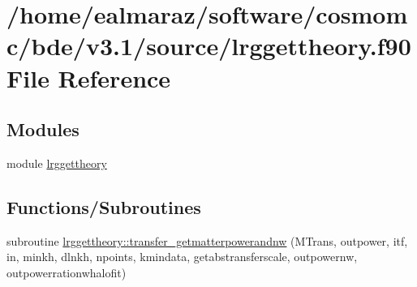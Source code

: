 \hypertarget{lrggettheory_8f90}{}\section{/home/ealmaraz/software/cosmomc/bde/v3.1/source/lrggettheory.f90 File Reference}
\label{lrggettheory_8f90}
\subsection*{Modules}
\begin{DoxyCompactItemize}
\item 
module \mbox{\hyperlink{namespacelrggettheory}{lrggettheory}}
\end{DoxyCompactItemize}
\subsection*{Functions/\+Subroutines}
\begin{DoxyCompactItemize}
\item 
subroutine \mbox{\hyperlink{namespacelrggettheory_abd8f5f818ab0125d9088ce80da0ca469}{lrggettheory\+::transfer\+\_\+getmatterpowerandnw}} (M\+Trans, outpower, itf, in, minkh, dlnkh, npoints, kmindata, getabstransferscale, outpowernw, outpowerrationwhalofit)
\end{DoxyCompactItemize}

